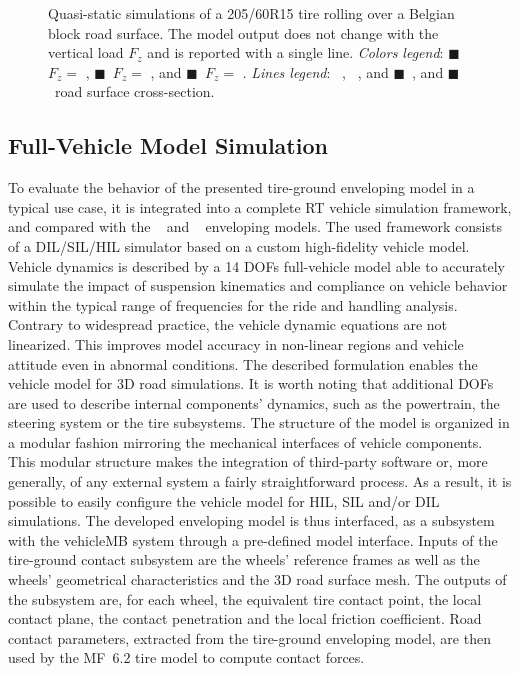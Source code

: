 \begin{figure}[htb]
  \centering
  \caption{Quasi-static simulations of a 205/60R15 tire rolling over a Belgian block road surface. The \TMEasy{} model output does not change with the vertical load $F_z$ and is reported with a single line. \emph{Colors legend}: {\color{mycolor1}$\blacksquare$}~$F_z =$ , {\color{mycolor2}$\blacksquare$}~$F_z =$ , and {\color{mycolor3}$\blacksquare$}~$F_z =$ . \emph{Lines legend}: \raisebox{1.0pt}{\textbf{---}}~\Enve{}, \raisebox{1.0pt}{\textbf{--~--}}~\Swift{}, and {\color{mycolor5}$\blacksquare$}~\TMEasy{}, and {\color{black}$\blacksquare$}~road surface cross-section.}
  \label{app2:fig:cobblestone}
\end{figure}


\subsection{Full-Vehicle Model Simulation}
\label{app2:sec:simulator}

To evaluate the behavior of the presented tire-ground enveloping model in a typical use case, it is integrated into a complete \ac{RT} vehicle simulation framework, and compared with the \Swift{}~\cite{schmeitz2004semiempirical} and \TMEasy~\cite{rill2013tmeasy, rill2018sophisticated}{} enveloping models. The used framework consists of a DIL/SIL/HIL simulator based on a custom high-fidelity vehicle model. Vehicle dynamics is described by a 14 \acp{DOF} full-vehicle model able to accurately simulate the impact of suspension kinematics and compliance on vehicle behavior within the typical range of frequencies for the ride and handling analysis. Contrary to widespread practice, the vehicle dynamic equations are not linearized. This improves model accuracy in non-linear regions and vehicle attitude even in abnormal conditions. The described formulation enables the vehicle model for 3D road simulations. It is worth noting that additional \acp{DOF} are used to describe internal components' dynamics, such as the powertrain, the steering system or the tire subsystems. The structure of the model is organized in a modular fashion mirroring the mechanical interfaces of vehicle components. This modular structure makes the integration of third-party software or, more generally, of any external system a fairly straightforward process. As a result, it is possible to easily configure the vehicle model for HIL, SIL and/or DIL simulations. The developed enveloping model is thus interfaced, as a subsystem with the vehicle\ac{MB} system through a pre-defined model interface. Inputs of the tire-ground contact subsystem are the wheels' reference frames as well as the wheels' geometrical characteristics and the 3D road surface mesh. The outputs of the subsystem are, for each wheel, the equivalent tire contact point, the local contact plane, the contact penetration and the local friction coefficient. Road contact parameters, extracted from the tire-ground enveloping model, are then used by the \ac{MF}~6.2 tire model to compute contact forces.


